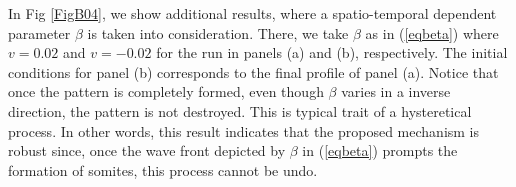 \documentclass[11pt]{article}
\begin{document}
In Fig \ref{FigB04}, we show additional results, where a spatio-temporal dependent parameter $\beta$ is taken into consideration. There, we take $\beta$ as in (\ref{eqbeta}) %
where $v=0.02$ and $v=-0.02$ for the run in panels (a) and (b), respectively. The initial conditions for panel (b) corresponds to the final profile of panel (a). Notice that once the pattern is completely formed, even though $\beta$ varies in a inverse direction, the pattern is not destroyed. This is typical trait of a hysteretical process. In other words, this result indicates that the proposed mechanism is robust since, once the wave front depicted by $\beta$ in (\ref{eqbeta}) prompts the formation of somites, this process cannot be undo.

\clearpage


\end{document}
